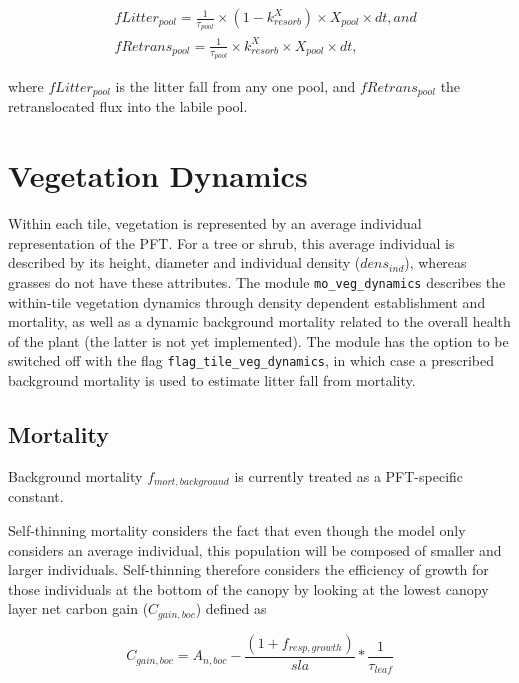 \begin{subequations}
\begin{align}
&fLitter_{pool} = \frac{1}{\tau_{pool}} \times (1-k_{resorb}^{X}) \times X_{pool} \times dt, and \\
&fRetrans_{pool} = \frac{1}{\tau_{pool}} \times k_{resorb}^{X} \times X_{pool} \times dt,
\end{align}
\end{subequations}

where $fLitter_{pool}$ is the litter fall from any one pool, and $fRetrans_{pool}$ the retranslocated flux into the labile pool.

\section{Vegetation Dynamics}

Within each tile, vegetation is represented by an average individual representation of the PFT. For a tree or shrub, this average individual is described by its height, diameter and individual density ($dens_{ind}$), whereas grasses do not have these attributes. The module \texttt{mo\_veg\_dynamics} describes the within-tile vegetation dynamics through density dependent establishment and mortality, as well as a dynamic background mortality related to the overall health of the plant (the latter is not yet implemented). The module has the option to be switched off with the flag \texttt{flag\_tile\_veg\_dynamics}, in which case a prescribed background mortality is used to estimate litter fall from mortality.  

\subsection{Mortality}

Background mortality $f_{mort,background}$ is currently treated as a PFT-specific constant. 

Self-thinning mortality considers the fact that even though the model only considers an average individual, this population will be composed of smaller and larger individuals. Self-thinning therefore considers the efficiency of growth for those individuals at the bottom of the canopy by looking at the lowest canopy layer net carbon gain ($C_{gain,boc}$) defined as 

\begin{equation}
C_{gain,boc} = A_{n,boc} -  \frac{(1 + f_{resp,growth})}{sla} * \frac{1}{\tau_{leaf}} 
\end{equation}
 
